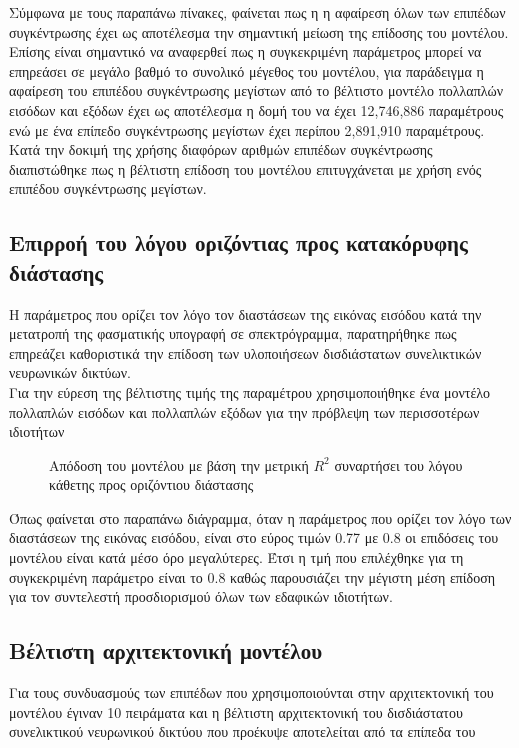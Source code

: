 Σύμφωνα με τους παραπάνω πίνακες, φαίνεται πως η η αφαίρεση όλων των επιπέδων συγκέντρωσης έχει ως αποτέλεσμα την σημαντική μείωση της επίδοσης του μοντέλου. Επίσης είναι σημαντικό να αναφερθεί πως η συγκεκριμένη παράμετρος μπορεί να επηρεάσει σε μεγάλο βαθμό το συνολικό μέγεθος του μοντέλου, για παράδειγμα η αφαίρεση του επιπέδου συγκέντρωσης μεγίστων από το βέλτιστο μοντέλο πολλαπλών εισόδων και εξόδων έχει ως αποτέλεσμα η δομή του να έχει 12,746,886 παραμέτρους ενώ με ένα επίπεδο συγκέντρωσης μεγίστων έχει περίπου 2,891,910 παραμέτρους. Κατά την δοκιμή της χρήσης διαφόρων αριθμών επιπέδων συγκέντρωσης διαπιστώθηκε πως η βέλτιστη επίδοση του μοντέλου επιτυγχάνεται με χρήση ενός επιπέδου συγκέντρωσης μεγίστων.

\subsection{Επιρροή του λόγου οριζόντιας προς κατακόρυφης διάστασης}
Η παράμετρος που ορίζει τον λόγο τον διαστάσεων της εικόνας εισόδου κατά την μετατροπή της φασματικής υπογραφή σε σπεκτρόγραμμα, παρατηρήθηκε πως επηρεάζει καθοριστικά την επίδοση των υλοποιήσεων δισδιάστατων συνελικτικών νευρωνικών δικτύων.\\
Για την εύρεση της βέλτιστης τιμής της παραμέτρου  χρησιμοποιήθηκε ένα μοντέλο πολλαπλών εισόδων και πολλαπλών εξόδων για την πρόβλεψη των περισσοτέρων ιδιοτήτων

\begin{figure}[H]
  \begin{center}
    
    \caption{Απόδοση του μοντέλου με βάση την μετρική $R^2$ συναρτήσει του λόγου κάθετης προς οριζόντιου διάστασης}
  \end{center}
\end{figure}

Όπως φαίνεται στο παραπάνω διάγραμμα, όταν η παράμετρος που ορίζει τον λόγο των διαστάσεων της εικόνας εισόδου, είναι στο εύρος τιμών 0.77 με 0.8 οι επιδόσεις του μοντέλου είναι κατά μέσο όρο μεγαλύτερες. Έτσι η τμή που επιλέχθηκε για τη συγκεκριμένη παράμετρο είναι το 0.8 καθώς παρουσιάζει την μέγιστη μέση επίδοση για τον συντελεστή προσδιορισμού όλων των εδαφικών ιδιοτήτων.

\subsection{Βέλτιστη αρχιτεκτονική μοντέλου}

Για τους συνδυασμούς των επιπέδων που χρησιμοποιούνται στην αρχιτεκτονική του μοντέλου έγιναν 10 πειράματα και η βέλτιστη αρχιτεκτονική του δισδιάστατου συνελικτικού νευρωνικού δικτύου που προέκυψε αποτελείται από τα επίπεδα του 


